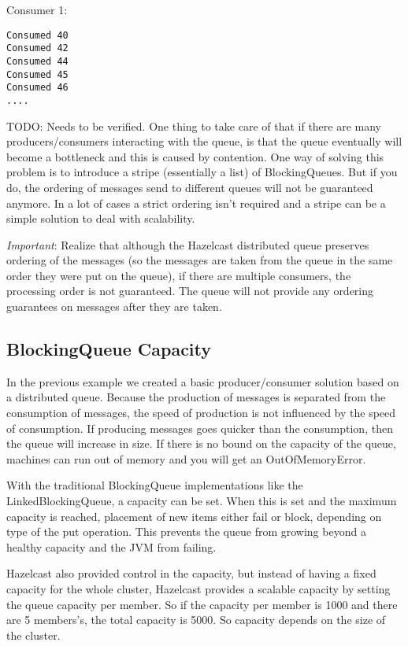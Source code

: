 Consumer 1:
\begin{verbatim}
Consumed 40  
Consumed 42 
Consumed 44 
Consumed 45
Consumed 46
....
\end{verbatim}

TODO: Needs to be verified.
One thing to take care of that if there are many producers/consumers interacting with the queue, is that the queue eventually will become a bottleneck and this is caused by contention. One way of solving this problem is to introduce a stripe (essentially a list) of BlockingQueues. But if you do, the ordering of messages send to different queues will not be guaranteed anymore. In a lot of cases a strict ordering isn't required and a stripe can be a simple solution to deal with scalability.

\emph{Important}: Realize that although the Hazelcast distributed queue preserves ordering of the messages (so the messages are taken from the queue in the same order they were put on the queue), if there are multiple consumers, the processing order is not guaranteed. The queue will not provide any ordering guarantees on messages after they are taken.

\subsection{BlockingQueue Capacity}
In the previous example we created a basic producer/consumer solution based on a distributed queue. Because the production of messages is separated from the consumption of messages, the speed of production is not influenced by the speed of consumption. If producing messages goes quicker than the consumption, then the queue will increase in size. If there is no bound on the capacity of the queue, machines can run out of memory and you will get an OutOfMemoryError. 

With the traditional BlockingQueue implementations like the LinkedBlockingQueue, a capacity can be set. When this is set and the maximum capacity is reached, placement of new items either fail or block, depending on type of the put operation. This prevents the queue from growing beyond a healthy capacity and the JVM from failing.

Hazelcast also provided control in the capacity, but instead of having a fixed capacity for the whole cluster, Hazelcast provides a scalable capacity by setting the queue capacity per member. So if the capacity per member is 1000 and there are 5 members's, the total capacity is 5000. So capacity depends on the size of the cluster.

